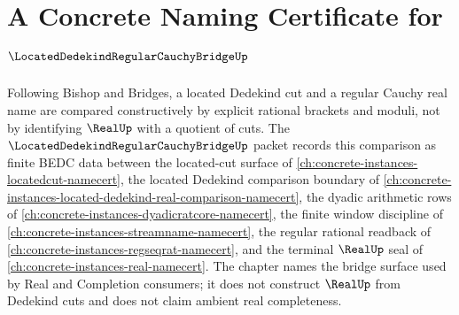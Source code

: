 \chapter{A Concrete Naming Certificate for $\LocatedDedekindRegularCauchyBridgeUp$}
\label{ch:concrete-instances-located-dedekind-regular-cauchy-bridge-namecert}

Following Bishop and Bridges, a located Dedekind cut and a regular Cauchy real name are compared constructively by explicit rational brackets and moduli, not by identifying $\RealUp$ with a quotient of cuts. The $\LocatedDedekindRegularCauchyBridgeUp$ packet records this comparison as finite BEDC data between the located-cut surface of \autoref{ch:concrete-instances-locatedcut-namecert}, the located Dedekind comparison boundary of \autoref{ch:concrete-instances-located-dedekind-real-comparison-namecert}, the dyadic arithmetic rows of \autoref{ch:concrete-instances-dyadicratcore-namecert}, the finite window discipline of \autoref{ch:concrete-instances-streamname-namecert}, the regular rational readback of \autoref{ch:concrete-instances-regseqrat-namecert}, and the terminal $\RealUp$ seal of \autoref{ch:concrete-instances-real-namecert}. The chapter names the bridge surface used by Real and Completion consumers; it does not construct $\RealUp$ from Dedekind cuts and does not claim ambient real completeness.

